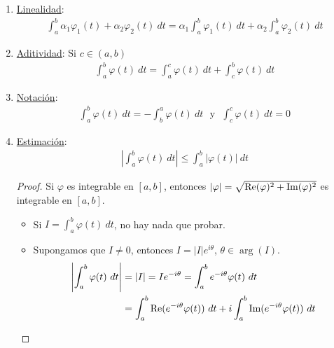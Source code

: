 \begin{obs}
    \begin{enumerate}
        \item \underline{Linealidad}:
              \begin{align*}
                  \int_{a}^{b}{\alpha_1\varphi_1(t) + \alpha_2\varphi_2(t) \ dt} = \alpha_1\int_{a}^{b}{\varphi_1(t) \ dt} + \alpha_2\int_{a}^{b}{\varphi_2(t) \ dt}
              \end{align*}
        \item \underline{Aditividad}: Si $c \in (a,b)$
              \begin{align*}
                  \int_{a}^{b}{\varphi(t) \ dt} = \int_{a}^{c}{\varphi(t) \ dt} + \int_{c}^{b}{\varphi(t) \ dt}
              \end{align*}
        \item \underline{Notación}:
              \begin{align*}
                  \int_{a}^{b}{\varphi(t) \ dt} = -\int_{b}^{a}{\varphi(t) \ dt} \ \ \ \text{y} \ \ \
                  \int_{c}^{c}{\varphi(t) \ dt} = 0
              \end{align*}
        \item \underline{Estimación}:
              \begin{align*}
                  \left| \int_{a}^{b}{\varphi(t) \ dt} \right| \leq \int_{a}^{b}{|\varphi(t)| \ dt}
              \end{align*}
              \begin{proof}
                  Si $\varphi$ es integrable en $[a,b]$, entonces $|\varphi| = \sqrt{\text{Re}(\varphi)^2 + \text{Im}(\varphi)^2}$ es integrable en $[a,b]$.
                  \begin{itemize}
                      \item Si $I = \int_{a}^{b}{\varphi(t) \ dt}$, no hay nada que probar.
                      \item Supongamos que $I \not = 0$, entonces $I = |I|e^{i\theta}$, $\theta \in \arg (I)$.
                            \begin{align*}
                                \left| \int_{a}^{b}{\varphi(t) \ dt} \right| & = |I| = Ie^{-i\theta} = \int_{a}^{b}{e^{-i\theta}\varphi(t) \ dt}                                                 \\
                                                                             & = \int_{a}^{b}{\re(e^{-i\theta}\varphi(t)) \ dt} + i\int_{a}^{b}{\im(e^{-i\theta}\varphi(t)) \ dt}                \\

\end{align*}
\end{itemize}
\end{proof}
\end{enumerate}
\end{obs}
